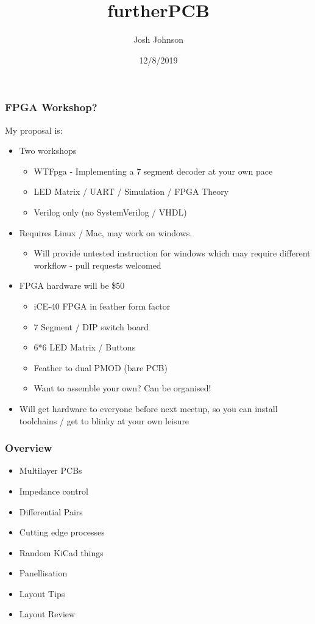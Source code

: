 \documentclass[t]{beamer}
\title[furtherPCB]{furtherPCB} %
\author{Josh Johnson} %
\institute[] %
{ \\ %
\medskip
\textit{} %
}
\date{12/8/2019} %
\begin{document}
\begin{frame}
\titlepage %
\end{frame}



\begin{frame}
\frametitle{FPGA Workshop?}
My proposal is:
\begin{itemize}
	\item Two workshops
	\begin{itemize}
		\item WTFpga - Implementing a 7 segment decoder at your own pace
		\item LED Matrix / UART / Simulation / FPGA Theory
		\item Verilog only (no SystemVerilog / VHDL)
	\end{itemize}
	\item Requires Linux / Mac, may work on windows.
	\begin{itemize}
		\item Will provide untested instruction for windows which may require different workflow - pull requests welcomed 
	\end{itemize}
	\item FPGA hardware will be \$50
	\begin{itemize}
		\item iCE-40 FPGA in feather form factor
		\item 7 Segment / DIP switch board
		\item 6*6 LED Matrix / Buttons
		\item Feather to dual PMOD (bare PCB)
		\item Want to assemble your own? Can be organised!
	\end{itemize}
	\item Will get hardware to everyone before next meetup, so you can install toolchains / get to blinky at your own leisure 
\end{itemize}
\end{frame}
\begin{frame}
\frametitle{Overview}
\begin{itemize}
	\item Multilayer PCBs
	\item Impedance control
	\item Differential Pairs
	\item Cutting edge processes
	\item Random KiCad things
	\item Panellisation
	\item Layout Tips
	\item Layout Review
\end{itemize}
\end{frame}
\end{document}
